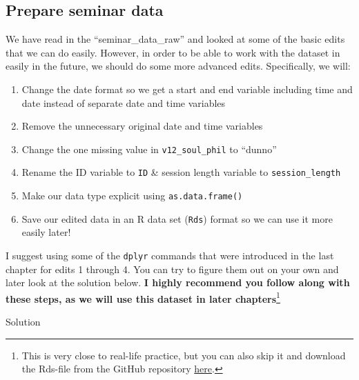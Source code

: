 \documentclass[
]{book}
\providecommand{\tightlist}{%
  \setlength{\itemsep}{0pt}\setlength{\parskip}{0pt}}
\begin{document}
\subsection*{Prepare seminar data}\label{prepare-seminar-data}

We have read in the ``seminar\_data\_raw'' and looked at some of the basic edits that we can do easily.
However, in order to be able to work with the dataset in easily in the future, we should do some more advanced edits.
Specifically, we will:

\begin{enumerate}
\def\labelenumi{\arabic{enumi}.}
\tightlist
\item
  Change the date format so we get a start and end variable including time and date instead of separate date and time variables
\item
  Remove the unnecessary original date and time variables
\item
  Change the one missing value in \texttt{v12\_soul\_phil} to ``dunno''
\item
  Rename the ID variable to \texttt{ID} \& session length variable to \texttt{session\_length}
\item
  Make our data type explicit using \texttt{as.data.frame()}
\item
  Save our edited data in an R data set (\texttt{Rds}) format so we can use it more easily later!
\end{enumerate}

I suggest using some of the \texttt{dplyr} commands that were introduced in the last chapter for edits 1 through 4.
You can try to figure them out on your own and later look at the solution below.
\textbf{I highly recommend you follow along with these steps, as we will use this dataset in later chapters}\footnote{This is very close to real-life practice, but you can also skip it and download the Rds-file from the GitHub repository \href{https://github.com/the-tave/psych_research_in_r/blob/main/data/seminar_data.Rds}{here}.}

Solution
\end{document}
